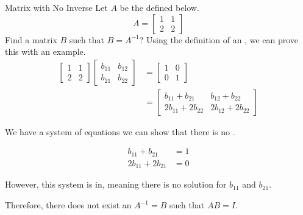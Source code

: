 \begin{example}{Matrix with No Inverse}
  Let $A$ be the  defined below.
  \begin{equation*}
    A =
    \begin{bmatrix}
      1 & 1 \\
      2 & 2
    \end{bmatrix}
  \end{equation*}
  Find a matrix $B$ such that $B = A^{-1}$?
  \tcblower{}
  Using the definition of an , we can prove this with an example.
  \begin{align*}
    \begin{bmatrix}
      1 & 1 \\
      2 & 2
    \end{bmatrix}
          \begin{bmatrix}
            b_{11} & b_{12} \\
            b_{21} & b_{22}
          \end{bmatrix}
        &=
          \begin{bmatrix}
            1 & 0 \\
            0 & 1
          \end{bmatrix} \\
    &=
      \begin{bmatrix}
        b_{11} + b_{21} & b_{12} + b_{22} \\
        2b_{11} + 2b_{22} & 2b_{12} + 2b_{22}
      \end{bmatrix}
  \end{align*}

  We have a system of equations we can show that there is no .

  \begin{align*}
    b_{11} + b_{21} &= 1 \\
    2b_{11} + 2b_{21} &= 0
  \end{align*}

  However, this system is in, meaning there is no solution for $b_{11}$ and $b_{21}$.

  Therefore, there does not exist an $A^{-1} = B$ such that $AB = I$.
\end{example}

